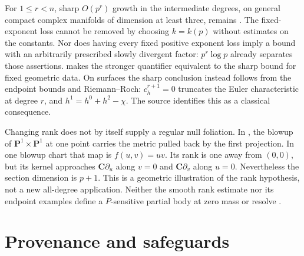 For \(1\leq r<n\), sharp \(O(p^r)\) growth in the intermediate
degrees, on general
compact complex manifolds of dimension at least three, remains
\cite[Question~11.3]{Qin26CurvatureRankV1}. The fixed-exponent loss
cannot be removed by choosing \(k=k(p)\) without estimates on the
constants. Nor does having every fixed positive exponent loss imply
a bound with an arbitrarily prescribed slowly divergent factor:
\(p^r\log p\) already separates those assertions.
\cite[Remark~11.4]{Qin26CurvatureRankV1} makes the stronger
quantifier equivalent to the sharp bound for fixed geometric data.
On surfaces the sharp conclusion instead follows from the endpoint
bounds and Riemann--Roch: \(c_h^{r+1}=0\) truncates the Euler
characteristic at degree \(r\), and
\(h^1=h^0+h^2-\chi\). The source identifies this as a classical
consequence.

Changing rank does not by itself supply a regular null foliation.
In \cite[Example~11.2]{Qin26CurvatureRankV1}, the blowup of
\(\mathbf P^1\times\mathbf P^1\) at one point carries the metric
pulled back by the first projection. In one blowup chart that map is
\(f(u,v)=uv\). Its rank is one away from \((0,0)\), but its kernel
approaches \(\mathbf C\partial_u\) along \(v=0\) and
\(\mathbf C\partial_v\) along \(u=0\). Nevertheless the section
dimension is \(p+1\). This is a geometric illustration of the
rank hypothesis, not a new all-degree application. Neither the
smooth rank estimate nor its endpoint examples define a
\(P\)-sensitive partial body at zero mass or resolve
.

\section{Provenance and safeguards}
\label{sec:ok-provenance}

